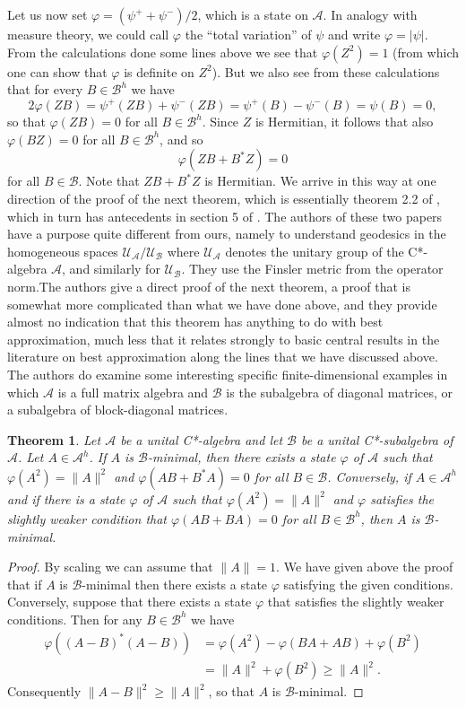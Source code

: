 \documentclass[12pt]{amsart}
\newcommand{\<}{\langle}
\renewcommand{\>}{\rangle}
\newcommand{\var}{\varphi}
\newcommand{\cA}{{\mathcal A}}
\newcommand{\cB}{{\mathcal B}}
\newcommand{\cU}{{\mathcal U}}
\newcommand{\cAH}{{\mathcal A}^h}
\newcommand{\cBH}{{\mathcal B}^h}
\newtheorem{theorem}{Theorem}[section]
\theoremstyle{definition}   %
\begin{document}
Let us now set $\var = (\psi^+ + \psi^-)/2$, which is a state on $\cA$.
In analogy with measure theory, we could call $\var$ the ``total
variation'' of $\psi$ and write $\var = |\psi|$.
From the calculations done some lines above we see that $\var(Z^2) = 1$
(from which one can show that $\var$ is definite on $Z^2$). But
we also see from these calculations that for every $B \in \cBH$ we have
\[
2\var(ZB) = \psi^+(ZB) + \psi^-(ZB) = \psi^+(B) - \psi^-(B)
= \psi(B) = 0,
\]
so that $\var(ZB) = 0$ for all $B \in \cBH$. Since $Z$ is Hermitian,
it follows that also $\var(BZ) = 0$ for all $B \in \cBH$, and so\[
\var(ZB + B^*Z) = 0
\]
for all $B \in \cB$. Note that $ZB + B^*Z$ is Hermitian. We arrive
in this way at one direction of the proof of the next theorem, which is 
essentially theorem 2.2 of \cite{AMM}, which in turn has antecedents
in section 5 of \cite{DMR}. The authors of these two papers have a purpose 
quite different from ours, namely to understand geodesics in the
homogeneous spaces $\cU_\cA/\cU_\cB$ where $\cU_\cA$ denotes
the unitary group of the C*-algebra $\cA$, and similarly for $\cU_\cB$.
They use the Finsler metric from the operator norm.The authors
give a direct proof of the next theorem, a proof that is somewhat more
complicated than what we have done above, and they provide almost no
indication that this theorem has anything to do with best
approximation, much less that it relates strongly to basic central 
results in the literature on best approximation along the lines that
we have discussed above. The authors do examine some interesting
specific finite-dimensional examples in which $\cA$ is a full matrix algebra
and $\cB$ is the subalgebra of diagonal matrices, or a subalgebra of
block-diagonal matrices.

\begin{theorem}
\label{thm-wit}
Let $\cA$ be a unital C*-algebra and let $\cB$ be a unital C*-subalgebra
of $\cA$. Let $A \in \cAH$. If $A$ is $\cB$-minimal, then there exists 
a state $\var$ of $\cA$ such that $\var(A^2) = \|A\|^2$ and
$\var(AB +B^*A) = 0$ for all $B \in \cB$. Conversely, if $A \in \cAH$ and
if there is a state $\var$ of $\cA$ such that  $\var(A^2) = \|A\|^2$ and
$\var$ satisfies the slightly weaker condition that $\var(AB +BA) = 0$ 
for all $B \in \cBH$, then $A$ is $\cB$-minimal.
\end{theorem}

\begin{proof}
By scaling we can assume that $\|A\| = 1$. We have given above the proof 
that if $A$ is $\cB$-minimal then there exists a state $\var$ satisfying the given 
conditions. Conversely, suppose that there exists a state $\var$ that satisfies 
the slightly weaker conditions. Then for any $B \in \cBH$ we have
\begin{align*} 
\var((A-B)^*(A-B)) & = \var(A^2) -\var(BA+AB)+\var(B^2)   \\
   & = \|A\|^2 + \var(B^2) \geq \|A\|^2  .
\end{align*}
Consequently $\|A-B\|^2 \geq \|A\|^2$, so that $A$ is $\cB$-minimal.
\end{proof}
\end{document}
